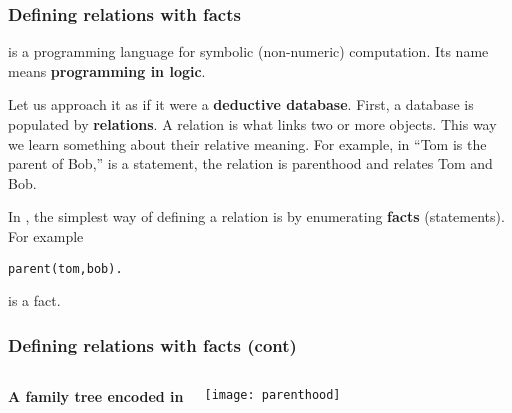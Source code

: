
%
\begin{frame}[containsverbatim]
\frametitle{Defining relations with facts}

\Prolog is a programming language for symbolic (non-numeric)
computation. Its name means \textbf{programming in logic}.

\bigskip

Let us approach it as if it were a \textbf{deductive database}. First,
a database is populated by \textbf{relations}. A relation is what
links two or more objects. This way we learn something about their
relative meaning. For example, in ``Tom is the parent of Bob,'' is a
statement, the relation is parenthood and relates Tom and Bob.

\bigskip

In \Prolog, the simplest way of defining a relation is by enumerating
\textbf{facts} (statements). For example
{\small 
\begin{verbatim}
parent(tom,bob).
\end{verbatim}
}
is a fact.

\end{frame}

%
\begin{frame}
\frametitle{Defining relations with facts (cont)}
\label{family_tree}


\begin{columns}
    \textbf{A family tree encoded in \Prolog}
    \begin{center}
       \texttt{[image: parenthood]}
    \end{center}
\end{columns}

\end{frame}

